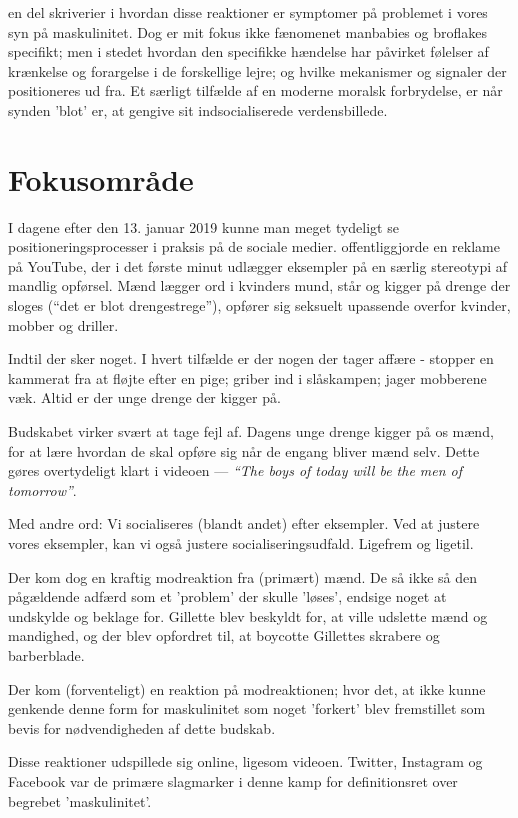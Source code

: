 en del skriverier i hvordan disse reaktioner er symptomer på
problemet i vores syn på maskulinitet.  Dog er mit fokus ikke
fænomenet manbabies og broflakes specifikt; men i stedet hvordan
den specifikke hændelse har påvirket følelser af krænkelse og
forargelse i de forskellige lejre; og hvilke mekanismer og
signaler der positioneres ud fra.  Et særligt tilfælde af en
moderne moralsk forbrydelse, er når synden 'blot' er, at gengive
sit indsocialiserede verdensbillede.


\section{Fokusområde}

I dagene efter den 13. januar 2019 kunne man meget tydeligt se
positioneringsprocesser i praksis på de sociale medier.
\citeauthor{gilletteWeBelieveBest2019}  offentliggjorde en reklame
på YouTube, der i det første minut udlægger eksempler på en særlig
stereotypi af mandlig opførsel. Mænd lægger ord i kvinders mund,
står og kigger på drenge der sloges (“det er blot drengestrege”),
opfører sig seksuelt upassende overfor kvinder, mobber og driller.

Indtil der sker noget. I hvert tilfælde er der nogen der tager
affære - stopper en kammerat fra at fløjte efter en pige; griber
ind i slåskampen; jager mobberene væk. Altid er der unge drenge
der kigger på.

Budskabet virker svært at tage fejl af. Dagens unge drenge kigger
på os mænd, for at lære hvordan de skal opføre sig når de engang
bliver mænd selv. Dette gøres overtydeligt klart i videoen --- 
\textit{“The boys of today will be the men of tomorrow”}.

Med andre ord: Vi socialiseres (blandt andet) efter eksempler. Ved
at justere vores eksempler, kan vi også justere
socialiseringsudfald. Ligefrem og ligetil.

Der kom dog en kraftig modreaktion fra (primært) mænd.
De så ikke så den pågældende adfærd som et 'problem' der skulle
'løses', endsige noget at undskylde og beklage for. Gillette blev
beskyldt for, at ville udslette mænd og mandighed, og der blev
opfordret til, at boycotte Gillettes skrabere og barberblade. 

Der kom (forventeligt) en reaktion på modreaktionen; hvor det, at
ikke kunne genkende denne form for maskulinitet som noget
'forkert' blev fremstillet som bevis for nødvendigheden af dette
budskab. 

Disse reaktioner udspillede sig online, ligesom videoen. Twitter,
Instagram og Facebook var de primære slagmarker i denne kamp for
definitionsret over begrebet 'maskulinitet'.

